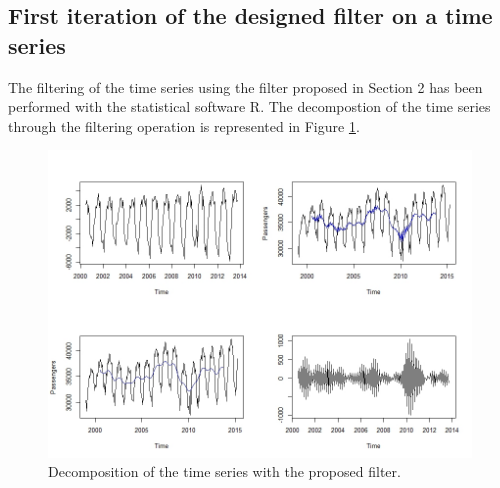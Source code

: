 \documentclass[english,blauw]{cbsdiscussionpaper}
\begin{document}
\subsection{First iteration of the designed filter on a time series}
The filtering of the time series using the filter proposed in Section 2 has been performed with the statistical software R. The decompostion of the time series through the filtering operation is represented in Figure \ref{fig:collage}.
\begin{figure}[h]
\includegraphics[width=\linewidth]{../images/capitolo4/collage.jpeg}
\caption{Decomposition of the time series with the proposed filter.}
\label{fig:collage}
\end{figure}
\end{document}
